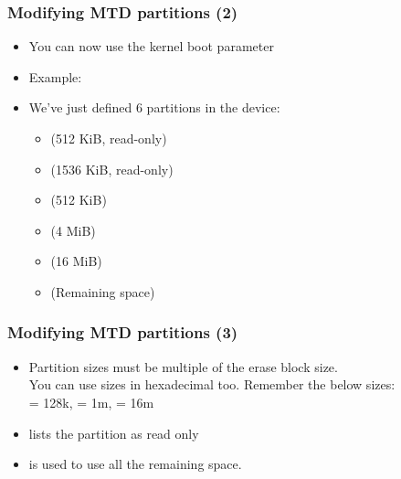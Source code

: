 \begin{frame}
  \frametitle{Modifying MTD partitions (2)}
  \begin{itemize}
  \item You can now use the  kernel boot parameter
  \item Example:\\
  \item We've just defined 6 partitions in the  device:
    \begin{itemize}
    \item {} (512 KiB, read-only)
    \item {} (1536 KiB, read-only)
    \item {} (512 KiB)
    \item {} (4 MiB)
    \item {} (16 MiB)
    \item {} (Remaining space)
    \end{itemize}
  \end{itemize}
\end{frame}

\begin{frame}
  \frametitle{Modifying MTD partitions (3)}
  \begin{itemize}
  \item Partition sizes must be multiple of the erase block size.\\
    You can use sizes in hexadecimal too. Remember the below sizes:\\
     = 128k,  = 1m,  = 16m
  \item {} lists the partition as read only
  \item \code{-} is used to use all the remaining space.
  \end{itemize}
\end{frame}

